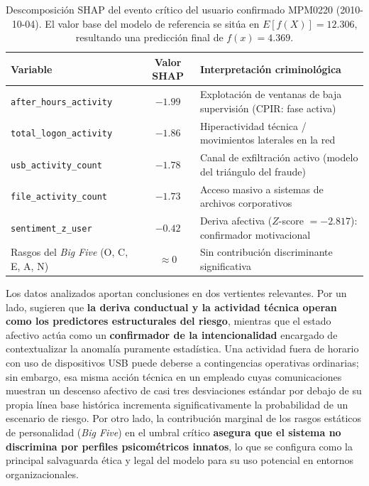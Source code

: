\documentclass[IB]{TFUOC}%
\begin{document}
\begin{enumerate}
\begin{table}[H]
\centering
\footnotesize
\begin{tabular}{l c p{7.5cm}}
\hline
\textbf{Variable} & \textbf{Valor SHAP} & \textbf{Interpretación criminológica} \\
\hline
\texttt{after\_hours\_activity} & $-1.99$ & Explotación de ventanas de baja supervisión (CPIR: fase activa) \\
\texttt{total\_logon\_activity} & $-1.86$ & Hiperactividad técnica / movimientos laterales en la red \\
\texttt{usb\_activity\_count} & $-1.78$ & Canal de exfiltración activo (modelo del triángulo del fraude) \\
\texttt{file\_activity\_count} & $-1.73$ & Acceso masivo a sistemas de archivos corporativos \\
\texttt{sentiment\_z\_user} & $-0.42$ & Deriva afectiva ($Z$-score $= -2.817$): confirmador motivacional \\
Rasgos del \textit{Big Five} (O, C, E, A, N) & $\approx 0$ & Sin contribución discriminante significativa \\
\hline
\end{tabular}
\caption{Descomposición SHAP del evento crítico del usuario confirmado MPM0220 (2010-10-04). El valor base del modelo de referencia se sitúa en $E[f(X)] = 12.306$, resultando una predicción final de $f(x) = 4.369$.}
\label{tab:shap_mpm}
\end{table}

\noindent Los datos analizados aportan conclusiones en dos vertientes relevantes. Por un lado, sugieren que \textbf{la deriva conductual y la actividad técnica operan como los predictores estructurales del riesgo}, mientras que el estado afectivo actúa como un \textbf{confirmador de la intencionalidad} encargado de contextualizar la anomalía puramente estadística. Una actividad fuera de horario con uso de dispositivos USB puede deberse a contingencias operativas ordinarias; sin embargo, esa misma acción técnica en un empleado cuyas comunicaciones muestran un descenso afectivo de casi tres desviaciones estándar por debajo de su propia línea base histórica incrementa significativamente la probabilidad de un escenario de riesgo. Por otro lado, la contribución marginal de los rasgos estáticos de personalidad (\textit{Big Five}) en el umbral crítico \textbf{asegura que el sistema no discrimina por perfiles psicométricos innatos}, lo que se configura como la principal salvaguarda ética y legal del modelo para su uso potencial en entornos organizacionales.


\end{enumerate}
\end{document}
